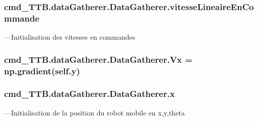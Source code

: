 \subsubsection[{\texorpdfstring{vitesse\+Lineaire\+En\+Commande}{vitesseLineaireEnCommande}}]{\setlength{\rightskip}{0pt plus 5cm}cmd\+\_\+\+T\+T\+B.\+data\+Gatherer.\+Data\+Gatherer.\+vitesse\+Lineaire\+En\+Commande}\hypertarget{classcmd__TTB_1_1dataGatherer_1_1DataGatherer_a92c6e630cfff49229d514a0ea1a26ce1}{}\label{classcmd__TTB_1_1dataGatherer_1_1DataGatherer_a92c6e630cfff49229d514a0ea1a26ce1}


---Initialisation des vitesses en commandes 

\subsubsection[{\texorpdfstring{Vx}{Vx}}]{\setlength{\rightskip}{0pt plus 5cm}cmd\+\_\+\+T\+T\+B.\+data\+Gatherer.\+Data\+Gatherer.\+Vx = np.\+gradient(self.\+y)\hspace{0.3cm}{\ttfamily [static]}}\hypertarget{classcmd__TTB_1_1dataGatherer_1_1DataGatherer_a695f502696fbf013ce1c9cda2c754917}{}\label{classcmd__TTB_1_1dataGatherer_1_1DataGatherer_a695f502696fbf013ce1c9cda2c754917}
\subsubsection[{\texorpdfstring{x}{x}}]{\setlength{\rightskip}{0pt plus 5cm}cmd\+\_\+\+T\+T\+B.\+data\+Gatherer.\+Data\+Gatherer.\+x}\hypertarget{classcmd__TTB_1_1dataGatherer_1_1DataGatherer_a088d7c0901296ea4bca154bab6c76aa9}{}\label{classcmd__TTB_1_1dataGatherer_1_1DataGatherer_a088d7c0901296ea4bca154bab6c76aa9}


---Initialisation de la position du robot mobile en x,y,theta 

